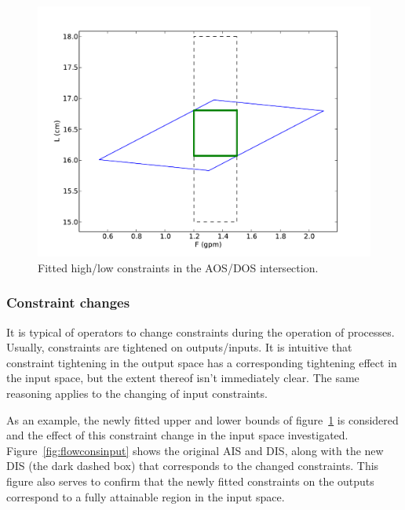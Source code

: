 \begin{figure}[htbp]
  \centering
    \includegraphics[width=\fullwidth]{graph/flowfitbox.pdf}
  \caption{Fitted high/low constraints in the AOS/DOS intersection.}
  \label{fig:flowfitbox}
\end{figure}

\subsubsection{Constraint changes}
It is typical of operators to change constraints during the operation of processes.
Usually, constraints are tightened on outputs/inputs.
It is intuitive that constraint tightening in the output space has a corresponding tightening effect in the input space, but the extent thereof isn't immediately clear.
The same reasoning applies to the changing of input constraints.

As an example, the newly fitted upper and lower bounds of figure~\ref{fig:flowfitbox} is considered and the effect of this constraint change in the input space investigated.
Figure~\ref{fig:flowconsinput} shows the original AIS and DIS, along with the new DIS (the dark dashed box) that corresponds to the changed constraints.
This figure also serves to confirm that the newly fitted constraints on the outputs correspond to a fully attainable region in the input space.

